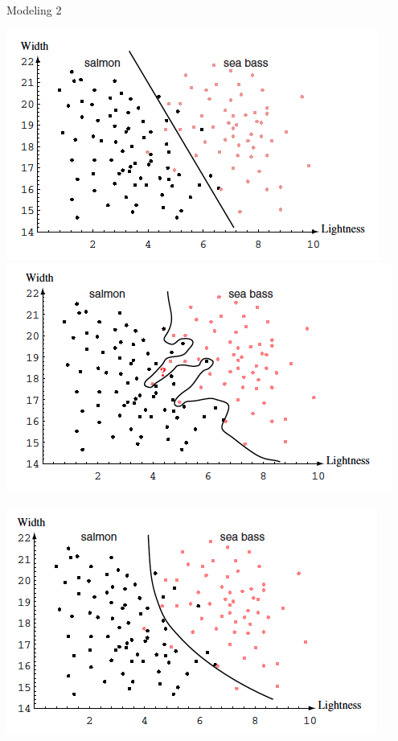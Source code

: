 \documentclass[10pt,a4paper]{beamer}
\begin{document}

\begin{frame}{Modeling 2}

\begin{center}
\includegraphics[scale=0.3]{images/3.png}
\includegraphics[scale=0.3]{images/4.png}

\includegraphics[scale=0.3]{images/5.png}
\end{center}

\end{frame}
\end{document}
